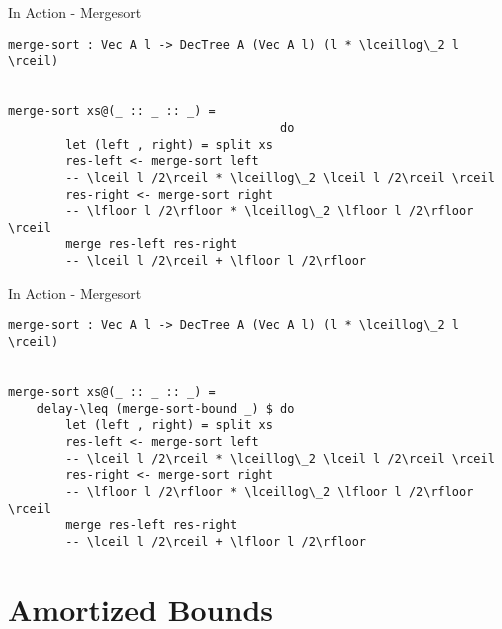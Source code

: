 \documentclass[11pt]{beamer}
\begin{document}
    \begin{frame}[fragile]{In Action - Mergesort}
        \begin{lstlisting}[emph={merge,sort,bound,split,return},showlines=true]
merge-sort : Vec A l -> DecTree A (Vec A l) (l * \lceillog\_2 l \rceil)


merge-sort xs@(_ :: _ :: _) =
                                      do
        let (left , right) = split xs
        res-left <- merge-sort left
        -- \lceil l /2\rceil * \lceillog\_2 \lceil l /2\rceil \rceil
        res-right <- merge-sort right
        -- \lfloor l /2\rfloor * \lceillog\_2 \lfloor l /2\rfloor \rceil
        merge res-left res-right
        -- \lceil l /2\rceil + \lfloor l /2\rfloor
        \end{lstlisting}
    \end{frame}

    \begin{frame}[fragile]{In Action - Mergesort}
        \begin{lstlisting}[emph={merge,sort,bound,split,return},showlines=true]
merge-sort : Vec A l -> DecTree A (Vec A l) (l * \lceillog\_2 l \rceil)


merge-sort xs@(_ :: _ :: _) =
    delay-\leq (merge-sort-bound _) $ do
        let (left , right) = split xs
        res-left <- merge-sort left
        -- \lceil l /2\rceil * \lceillog\_2 \lceil l /2\rceil \rceil
        res-right <- merge-sort right
        -- \lfloor l /2\rfloor * \lceillog\_2 \lfloor l /2\rfloor \rceil
        merge res-left res-right
        -- \lceil l /2\rceil + \lfloor l /2\rfloor
        \end{lstlisting}
    \end{frame}

    \section{Amortized Bounds}

\end{document}
